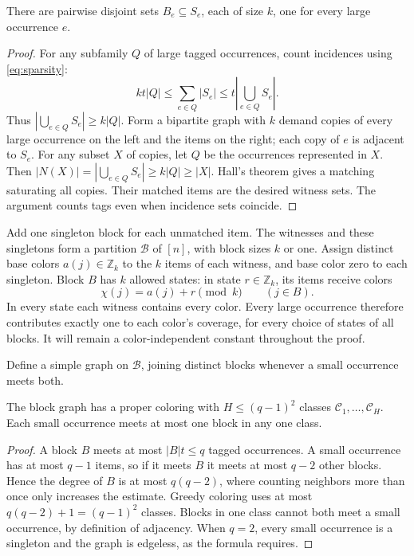 \documentclass[acmsmall,11pt,nonacm]{acmart}
\newcommand{\Zk}{\mathbb{Z}_k}
\newcommand{\calB}{\mathcal{B}}
\newcommand{\calC}{\mathcal{C}}
\begin{document}
\begin{lemma}
\label{lem:witness}
There are pairwise disjoint sets $B_e\subseteq S_e$, each of size $k$,
one for every large occurrence $e$.
\end{lemma}
\begin{proof}
For any subfamily $Q$ of large tagged occurrences, count incidences using
\eqref{eq:sparsity}:
\[
 kt|Q|\le\sum_{e\in Q}|S_e|
         \le t\left|\bigcup_{e\in Q}S_e\right|.
\]
Thus $|\bigcup_{e\in Q}S_e|\ge k|Q|$. Form a bipartite graph with $k$
demand copies of every large occurrence on the left and the items on the
right; each copy of $e$ is adjacent to $S_e$. For any subset $X$ of
copies, let $Q$ be the occurrences represented in $X$. Then
$|N(X)|=|\bigcup_{e\in Q}S_e|\ge k|Q|\ge|X|$. Hall's theorem gives a
matching saturating all copies. Their matched items are the desired
witness sets. The argument counts tags even when incidence sets coincide.
\end{proof}

Add one singleton block for each unmatched item. The witnesses and these
singletons form a partition $\calB$ of $[n]$, with block sizes $k$ or one.
Assign distinct base colors $a(j)\in\Zk$ to the $k$ items of each witness,
and base color zero to each singleton. Block $B$ has $k$ allowed states:
in state $r\in\Zk$, its items receive colors
\begin{equation}
 \chi(j)=a(j)+r\pmod k \qquad(j\in B).
 \label{eq:states}
\end{equation}
In every state each witness contains every color. Every large occurrence
therefore contributes exactly one to each color's coverage, for every
choice of states of all blocks. It will remain a color-independent
constant throughout the proof.

Define a simple graph on $\calB$, joining distinct blocks whenever a small
occurrence meets both.

\begin{lemma}
\label{lem:classes}
The block graph has a proper coloring with
$H\le(q-1)^2$ classes $\calC_1,\ldots,\calC_H$. Each small occurrence
meets at most one block in any one class.
\end{lemma}
\begin{proof}
A block $B$ meets at most $|B|t\le q$ tagged occurrences. A small
occurrence has at most $q-1$ items, so if it meets $B$ it meets at most
$q-2$ other blocks. Hence the degree of $B$ is at most $q(q-2)$,
where counting neighbors more than once only increases the estimate.
Greedy coloring uses at most $q(q-2)+1=(q-1)^2$ classes. Blocks in one
class cannot both meet a small occurrence, by definition of adjacency.
When $q=2$, every small occurrence is a singleton and the graph is
edgeless, as the formula requires.
\end{proof}
\end{document}
